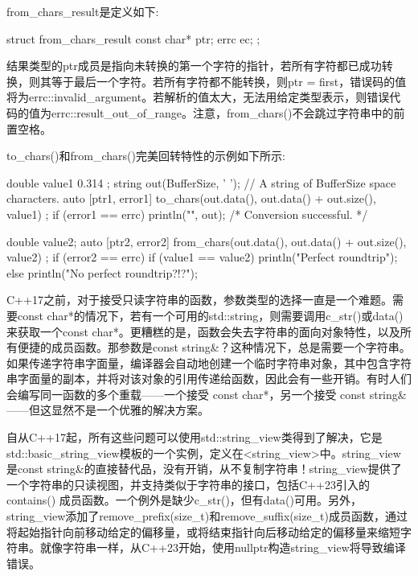 from\_chars\_result是定义如下:

\begin{cpp}
struct from_chars_result {
    const char* ptr;
    errc ec;
};
\end{cpp}

结果类型的ptr成员是指向未转换的第一个字符的指针，若所有字符都已成功转换，则其等于最后一个字符。若所有字符都不能转换，则ptr = first，错误码的值将为errc::invalid\_argument。若解析的值太大，无法用给定类型表示，则错误代码的值为errc::result\_out\_of\_range。注意，from\_chars()不会跳过字符串中的前置空格。

to\_chars()和from\_chars()完美回转特性的示例如下所示:

\begin{cpp}
double value1 { 0.314 };
string out(BufferSize, ' '); // A string of BufferSize space characters.
auto [ptr1, error1] { to_chars(out.data(), out.data() + out.size(), value1) };
if (error1 == errc{}) { println("{}", out); /* Conversion successful. */ }

double value2;
auto [ptr2, error2] { from_chars(out.data(), out.data() + out.size(), value2) };
if (error2 == errc{}) {
    if (value1 == value2) {
        println("Perfect roundtrip");
    } else {
        println("No perfect roundtrip?!?");
    }
}
\end{cpp}


C++17之前，对于接受只读字符串的函数，参数类型的选择一直是一个难题。需要const char*的情况下，若有一个可用的std::string，则需要调用c\_str()或data()来获取一个const char*。更糟糕的是，函数会失去字符串的面向对象特性，以及所有便捷的成员函数。那参数是const string\&？这种情况下，总是需要一个字符串。如果传递字符串字面量，编译器会自动地创建一个临时字符串对象，其中包含字符串字面量的副本，并将对该对象的引用传递给函数，因此会有一些开销。有时人们会编写同一函数的多个重载——一个接受 const char*，另一个接受 const string\&——但这显然不是一个优雅的解决方案。

自从C++17起，所有这些问题可以使用std::string\_view类得到了解决，它是std::basic\_string\_view模板的一个实例，定义在<string\_view>中。string\_view 是const string\&的直接替代品，没有开销，从不复制字符串！string\_view提供了一个字符串的只读视图，并支持类似于字符串的接口，包括C++23引入的contains() 成员函数。一个例外是缺少c\_str()，但有data()可用。另外，string\_view添加了remove\_prefix(size\_t)和remove\_suffix(size\_t)成员函数，通过将起始指针向前移动给定的偏移量，或将结束指针向后移动给定的偏移量来缩短字符串。就像字符串一样，从C++23开始，使用nullptr构造string\_view将导致编译错误。

